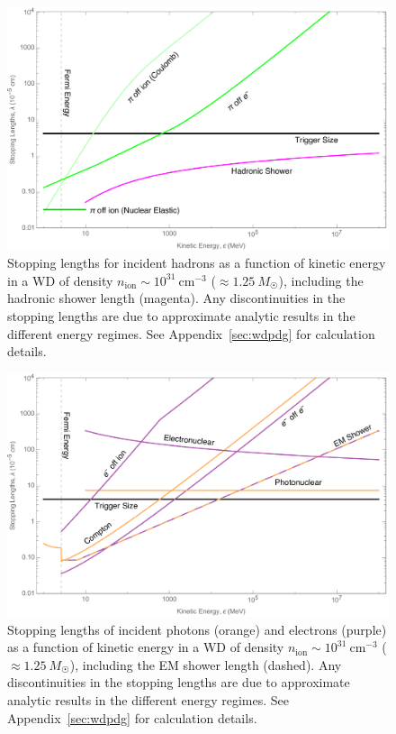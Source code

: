 \begin{figure}
\includegraphics[scale=.35]{SPhighHad.pdf}
\caption{Stopping lengths for incident hadrons as a function of kinetic energy in a WD of density $n_\text{ion} \sim 10^{31}~\text{cm}^{-3}$ ($\approx 1.25 ~M_{\astrosun}$), including the hadronic shower length (magenta).
Any discontinuities in the stopping lengths are due to approximate analytic results in the different energy regimes.
See Appendix~\ref{sec:wdpdg} for calculation details.
}
\label{fig:SPhighHad}
\end{figure}

\begin{figure}
\includegraphics[scale=.35]{SPhighEM.pdf}
\caption{Stopping lengths of incident photons (orange) and electrons (purple) as a function of kinetic energy in a WD of density $n_\text{ion} \sim 10^{31}~\text{cm}^{-3}$ ($\approx 1.25 ~M_{\astrosun}$), including the EM shower length (dashed).
Any discontinuities in the stopping lengths are due to approximate analytic results in the different energy regimes.
See Appendix~\ref{sec:wdpdg} for calculation details.
}
\label{fig:SPhighEM}
\end{figure}


